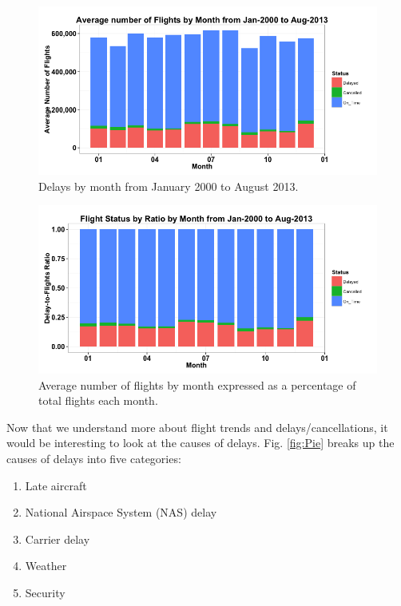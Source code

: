 \documentclass[11pt,twoside,titlepage]{article}
\begin{document}
\begin{figure}[h!]
        \centering
                \includegraphics[width=16cm]{Bar1.png}
        \caption{Delays by month from January 2000 to August 2013.}\label{fig:Flights by Month}
\end{figure}

\begin{figure}[h!]
        \centering
                \includegraphics[width=16cm]{Bar2.png}
        \caption{Average number of flights by month expressed as a percentage of total flights each month.}\label{fig:Flights by Month Percentage}
\end{figure}

\clearpage
Now that we understand more about flight trends and delays/cancellations, it would be interesting to look at the causes of delays. Fig. \ref{fig:Pie} breaks up the causes of delays into five categories:
\begin{enumerate}\itemsep1pt \parskip0pt 
  \item Late aircraft
  \item National Airspace System (NAS) delay
  \item Carrier delay
  \item Weather
  \item Security
\end{enumerate}
\end{document}
